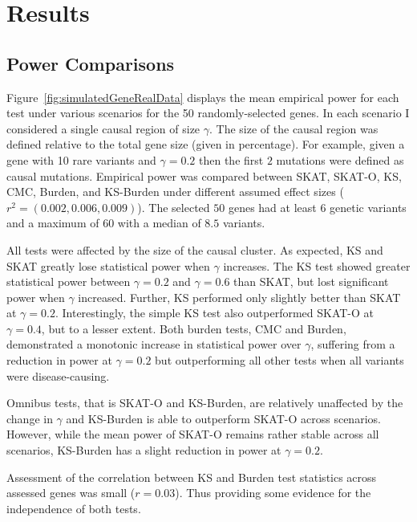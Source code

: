 \section{Results}
\label{sec:results_ksburden}

\subsection{Power Comparisons}
\label{sub:power_comparisons}

Figure~\ref{fig:simulatedGeneRealData} displays the mean empirical power for each test under various scenarios for the 50 randomly-selected genes.
In each scenario I considered a single causal region of size $\gamma$.
The size of the causal region was defined relative to the total gene size (given in percentage).
For example, given a gene with 10 rare variants and $\gamma=0.2$ then the first $2$ mutations were defined as causal mutations.
Empirical power was compared between SKAT, SKAT-O, KS, CMC, Burden, and KS-Burden under different assumed effect sizes ($r^2=(0.002, 0.006, 0.009)$).
The selected $50$ genes had at least $6$ genetic variants and a maximum of $60$ with a median of $8.5$ variants.

All tests were affected by the size of the causal cluster.
As expected, KS and SKAT greatly lose statistical power when $\gamma$ increases.
The KS test showed greater statistical power between $\gamma=0.2$ and $\gamma=0.6$ than SKAT, but lost significant power when $\gamma$ increased.
Further, KS performed only slightly better than SKAT at $\gamma=0.2$.
Interestingly, the simple KS test also outperformed SKAT-O at $\gamma=0.4$, but to a lesser extent.
Both burden tests, CMC and Burden, demonstrated a monotonic increase in statistical power over $\gamma$,
 suffering from a reduction in power at $\gamma=0.2$ but outperforming all other tests when all variants were disease-causing.

Omnibus tests, that is SKAT-O and KS-Burden, are relatively unaffected by the change in $\gamma$ and KS-Burden is able to outperform SKAT-O across scenarios.
However, while the mean power of SKAT-O remains rather stable across all scenarios, KS-Burden has a slight reduction in power at $\gamma=0.2$.

Assessment of the correlation between KS and Burden test statistics across assessed genes was small ($r=0.03$).
Thus providing some evidence for the independence of both tests. %

